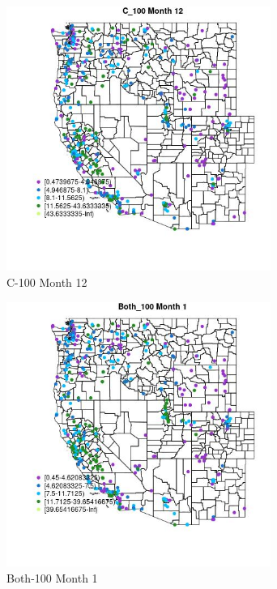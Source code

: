 \begin{figure} 
\centering  
\includegraphics[width=0.77\textwidth]{Code_Outputs/ML_input_report_ML_input_PM25_Step5_part_d_de_duplicated_aves_ML_input_MapObsMo12C_100.jpg} 
\caption{\label{fig:ML_input_report_ML_input_PM25_Step5_part_d_de_duplicated_aves_ML_inputMapObsMo12C_100}C-100 Month 12} 
\end{figure} 
 

\begin{figure} 
\centering  
\includegraphics[width=0.77\textwidth]{Code_Outputs/ML_input_report_ML_input_PM25_Step5_part_d_de_duplicated_aves_ML_input_MapObsMo1Both_100.jpg} 
\caption{\label{fig:ML_input_report_ML_input_PM25_Step5_part_d_de_duplicated_aves_ML_inputMapObsMo1Both_100}Both-100 Month 1} 
\end{figure} 
 

